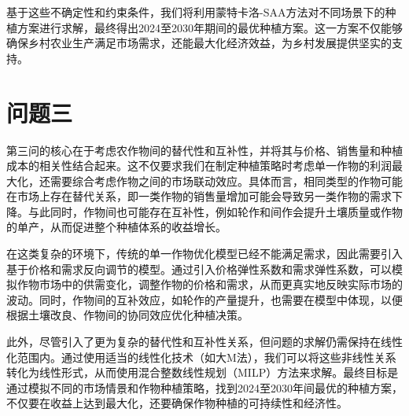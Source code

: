 基于这些不确定性和约束条件\cite{YOKE201304018}，我们将利用蒙特卡洛-SAA方法对不同场景下的种植方案进行求解，最终得出2024至2030年期间的最优种植方案。这一方案不仅能够确保乡村农业生产满足市场需求，还能最大化经济效益，为乡村发展提供坚实的支持。
\section[\hspace{-2pt}问题三]{{\heiti{} \hspace{-8pt}问题三}}\label{section1: 问题三}


第三问的核心在于考虑农作物间的替代性和互补性\cite{1024823406.nh}，并将其与价格、销售量和种植成本的相关性结合起来。这不仅要求我们在制定种植策略时考虑单一作物的利润最大化，还需要综合考虑作物之间的市场联动效应。具体而言，相同类型的作物可能在市场上存在替代关系，即一类作物的销售量增加可能会导致另一类作物的需求下降。与此同时，作物间也可能存在互补性，例如轮作和间作会提升土壤质量或作物的单产，从而促进整个种植体系的收益增长。

在这类复杂的环境下，传统的单一作物优化模型已经不能满足需求，因此需要引入基于价格和需求反向调节的模型。通过引入价格弹性系数和需求弹性系数，可以模拟作物市场中的供需变化，调整作物的价格和需求，从而更真实地反映实际市场的波动。同时，作物间的互补效应，如轮作的产量提升，也需要在模型中体现，以便根据土壤改良、作物间的协同效应优化种植决策。

此外，尽管引入了更为复杂的替代性和互补性关系，但问题的求解仍需保持在线性化范围内。通过使用适当的线性化技术（如大M法），我们可以将这些非线性关系转化为线性形式，从而使用混合整数线性规划（MILP）方法来求解。最终目标是通过模拟不同的市场情景和作物种植策略，找到2024至2030年间最优的种植方案，不仅要在收益上达到最大化，还要确保作物种植的可持续性和经济性。


